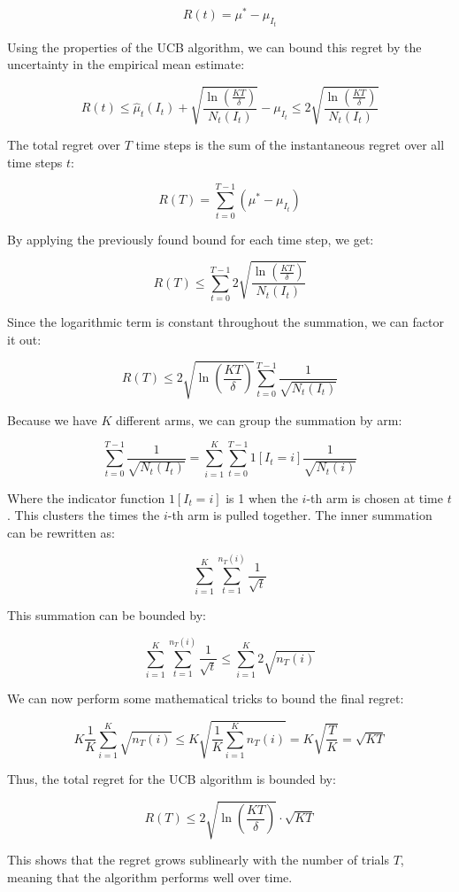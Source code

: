 $$
    R(t) = \mu^* - \mu_{I_t}
$$

Using the properties of the UCB algorithm, we can bound this regret by the uncertainty in the empirical mean estimate:

$$
    R(t) \leq \hat{\mu}_t(I_t) + \sqrt{\frac{\ln\left(\frac{KT}{\delta}\right)}{N_t(I_t)}} - \mu_{I_t} \leq 2 \sqrt{\frac{\ln\left(\frac{KT}{\delta}\right)}{N_t(I_t)}}
$$

The total regret over $T$ time steps is the sum of the instantaneous regret over all time steps $t$:

$$
    R(T) = \sum_{t=0}^{T-1} (\mu^* - \mu_{I_t})
$$

By applying the previously found bound for each time step, we get:

$$
    R(T) \leq \sum_{t=0}^{T-1} 2 \sqrt{\frac{\ln\left(\frac{KT}{\delta}\right)}{N_t(I_t)}}
$$

Since the logarithmic term is constant throughout the summation, we can factor it out:

$$
    R(T) \leq 2 \sqrt{\ln\left(\frac{KT}{\delta}\right)} \sum_{t=0}^{T-1} \frac{1}{\sqrt{N_t(I_t)}}
$$

Because we have $K$ different arms, we can group the summation by arm:

$$
    \sum_{t=0}^{T-1} \frac{1}{\sqrt{N_t(I_t)}} = \sum_{i=1}^{K} \sum_{t=0}^{T-1} 1[I_t = i] \frac{1}{\sqrt{N_t(i)}}
$$

Where the indicator function $1[I_t = i]$ is 1 when the $i$-th arm is chosen at time $t$. This clusters the times the $i$-th arm is pulled together. The inner summation can be rewritten as:

$$
    \sum_{i=1}^{K} \sum_{t=1}^{n_T(i)} \frac{1}{\sqrt{t}}
$$

This summation can be bounded by:

$$
    \sum_{i=1}^{K} \sum_{t=1}^{n_T(i)} \frac{1}{\sqrt{t}} \leq \sum_{i=1}^{K} 2 \sqrt{n_T(i)}
$$

We can now perform some mathematical tricks to bound the final regret:

$$
    K \frac{1}{K} \sum_{i=1}^{K} \sqrt{n_T(i)} \leq K \sqrt{\frac{1}{K} \sum_{i=1}^{K} n_T(i)} = K \sqrt{\frac{T}{K}} = \sqrt{KT}
$$

Thus, the total regret for the UCB algorithm is bounded by:

$$
    R(T) \leq 2 \sqrt{\ln\left(\frac{KT}{\delta}\right)} \cdot \sqrt{KT}
$$

This shows that the regret grows sublinearly with the number of trials $T$, meaning that the algorithm performs well over time.